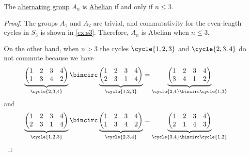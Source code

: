 \begin{proposition}\label{thm:an_commutativity}
  The \hyperref[def:alternating_group]{alternating group} \( A_n \) is \hyperref[def:abelian_group]{Abelian} if and only if \( n \leq 3 \).
\end{proposition}
\begin{proof}
  The groups \( A_1 \) and \( A_2 \) are trivial, and commutativity for the even-length cycles in \( S_3 \) is shown in \cref{ex:s3}. Therefore, \( A_n \) is Abelian when \( n \leq 3 \).

  On the other hand, when \( n > 3 \) the cycles \( \cycle{ 1, 2, 3 } \) and \( \cycle{ 2, 3, 4 } \) do not commute because we have
  \begin{equation*}
    \underbrace
      {
        \begin{pmatrix}
          1 & 2 & 3 & 4 \\
          1 & 3 & 4 & 2
        \end{pmatrix}
      }_{\cycle{ 2, 3, 4 }}
    \bincirc
    \underbrace
      {
        \begin{pmatrix}
          1 & 2 & 3 & 4 \\
          2 & 3 & 1 & 4
        \end{pmatrix}
      }_{\cycle{ 1, 2, 3 }}
    =
    \underbrace
      {
        \begin{pmatrix}
          1 & 2 & 3 & 4 \\
          3 & 4 & 1 & 2
        \end{pmatrix}
      }_{\cycle{ 2, 4 } \bincirc \cycle{ 1, 3 }}
  \end{equation*}
  and
  \begin{equation*}
    \underbrace
      {
        \begin{pmatrix}
          1 & 2 & 3 & 4 \\
          2 & 3 & 1 & 4
        \end{pmatrix}
      }_{\cycle{ 1, 2, 3 }}
    \bincirc
    \underbrace
      {
        \begin{pmatrix}
          1 & 2 & 3 & 4 \\
          1 & 3 & 4 & 2
        \end{pmatrix}
      }_{\cycle{ 2, 3, 4 }}
    =
    \underbrace
      {
        \begin{pmatrix}
          1 & 2 & 3 & 4 \\
          2 & 1 & 4 & 3
        \end{pmatrix}
      }_{\cycle{ 3, 4 } \bincirc \cycle{ 1, 2 }}
  \end{equation*}
\end{proof}
